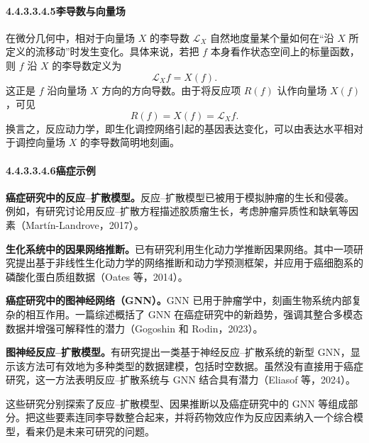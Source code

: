 \paragraph*{4.4.3.3.4.5\quad 李导数与向量场}
在微分几何中，相对于向量场 $X$ 的李导数 $\mathcal L_X$ 自然地度量某个量如何在“沿 $X$ 所定义的流移动”时发生变化。具体来说，若把 $f$ 本身看作状态空间上的标量函数，则 $f$ 沿 $X$ 的李导数定义为
\[
  \mathcal L_Xf=X(f).
\]
这正是 $f$ 沿向量场 $X$ 方向的方向导数。由于将反应项 $R(f)$ 认作向量场 $X(f)$，可见
\[
  R(f)=X(f)=\mathcal L_Xf.
\]
换言之，反应动力学，即生化调控网络引起的基因表达变化，可以由表达水平相对于调控向量场 $X$ 的李导数简明地刻画。

\paragraph*{4.4.3.3.4.6\quad 癌症示例}
\textbf{癌症研究中的反应–扩散模型。}反应–扩散模型已被用于模拟肿瘤的生长和侵袭。例如，有研究讨论用反应–扩散方程描述胶质瘤生长，考虑肿瘤异质性和缺氧等因素（Martín-Landrove，2017）。

\textbf{生化系统中的因果网络推断。}已有研究利用生化动力学推断因果网络。其中一项研究提出基于非线性生化动力学的网络推断和动力学预测框架，并应用于癌细胞系的磷酸化蛋白质组数据（Oates 等，2014）。

\textbf{癌症研究中的图神经网络（GNN）。}GNN 已用于肿瘤学中，刻画生物系统内部复杂的相互作用。一篇综述概括了 GNN 在癌症研究中的新趋势，强调其整合多模态数据并增强可解释性的潜力（Gogoshin 和 Rodin，2023）。

\textbf{图神经反应–扩散模型。}有研究提出一类基于神经反应–扩散系统的新型 GNN，显示该方法可有效地为多种类型的数据建模，包括时空数据。虽然没有直接用于癌症研究，这一方法表明反应–扩散系统与 GNN 结合具有潜力（Eliasof 等，2024）。

这些研究分别探索了反应–扩散模型、因果推断以及癌症研究中的 GNN 等组成部分。把这些要素连同李导数整合起来，并将药物效应作为反应因素纳入一个综合模型，看来仍是未来可研究的问题。

